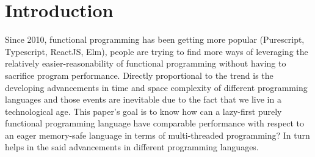 \chapter{Introduction}

Since 2010, functional programming has been getting more 
popular (Purescript, Typescript, ReactJS, Elm), people are 
trying to find more ways of leveraging the relatively easier-reasonability 
of functional programming without having to sacrifice 
program performance. Directly proportional to the trend is 
the developing advancements in time and space complexity 
of different programming languages and those events are 
inevitable due to the fact that we live in a technological 
age. This paper’s goal is to know how can a lazy-first 
purely functional programming language have comparable 
performance with respect to an eager memory-safe language 
in terms of multi-threaded programming? In turn helps in 
the said advancements in different programming languages.




